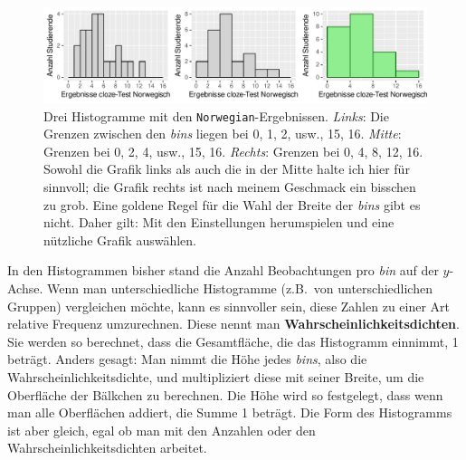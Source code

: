 \documentclass[oneside, 10pt]{book}\usepackage[]{graphicx}\usepackage[]{xcolor}
\newenvironment{knitrout}{}{} %
\begin{document}
\begin{knitrout}
\color{fgcolor}\begin{figure}[tp]

{\centering \includegraphics[width=\textwidth]{figs/unnamed-chunk-84-1} 

}

\caption{Drei Histogramme mit den \texttt{Norwegian}-Ergebnissen. \textit{Links}: Die Grenzen zwischen den \textit{bins} liegen bei 0, 1, 2, usw., 15, 16. \textit{Mitte}: Grenzen bei 0, 2, 4, usw., 15, 16. \textit{Rechts}: Grenzen bei 0, 4, 8, 12, 16. Sowohl die Grafik links als auch die in der Mitte halte ich hier für sinnvoll; die Grafik rechts ist nach meinem Geschmack ein bisschen zu grob. Eine goldene Regel für die Wahl der Breite der \textit{bins} gibt es nicht. Daher gilt: Mit den Einstellungen herumspielen und eine nützliche Grafik auswählen.\label{fig:histogram}}\label{fig:unnamed-chunk-84}
\end{figure}

\end{knitrout}
 
In den Histogrammen bisher stand die Anzahl
Beobachtungen pro \textit{bin} auf der $y$-Achse.
Wenn man unterschiedliche Histogramme (z.B.\ von unterschiedlichen
Gruppen) vergleichen möchte, kann es sinnvoller sein, diese
Zahlen zu einer Art relative Frequenz umzurechnen.
Diese nennt man \textbf{Wahrscheinlichkeitsdichten}.
Sie werden so berechnet, dass die Gesamtfläche, die das Histogramm
einnimmt, 1 beträgt. Anders gesagt: Man nimmt die Höhe jedes \textit{bins},
also die Wahrscheinlichkeitsdichte, und multipliziert diese mit seiner Breite,
um die Oberfläche der Bälkchen zu berechnen. Die Höhe wird so festgelegt,
dass wenn man alle Oberflächen addiert, die Summe 1 beträgt. Die Form
des Histogramms ist aber gleich, egal ob man mit den Anzahlen oder den
Wahrscheinlichkeitsdichten arbeitet.
\end{document}
